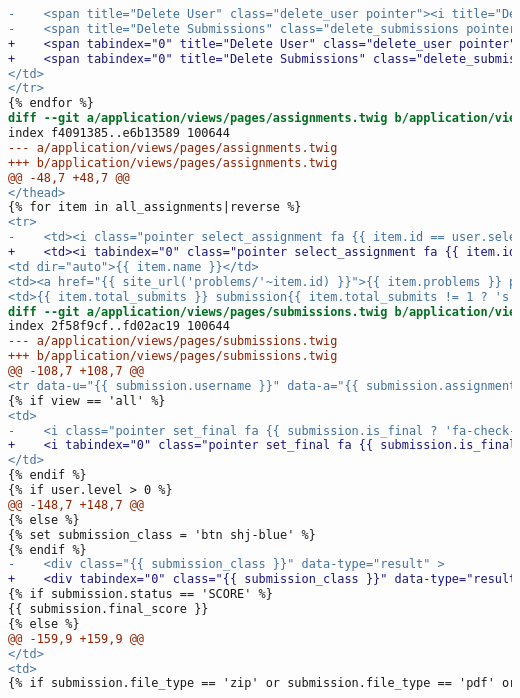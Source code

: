 \begin{itemize}
\begin{lstlisting}[language=diff, caption=Perubahan untuk mematuhi kriteria 2.1.1, label=lst_2.1.1, basicstyle=\ttfamily, frame=single,
columns=fullflexible, keepspaces=true, breaklines=true]
-    <span title="Delete User" class="delete_user pointer"><i title="Delete User" class="fa fa-times fa-lg color2"></i></span>
-    <span title="Delete Submissions" class="delete_submissions pointer"><i class="fa fa-times-circle fa-lg color1"></i></span>
+    <span tabindex="0" title="Delete User" class="delete_user pointer"><i title="Delete User" class="fa fa-times fa-lg color2"></i></span>
+    <span tabindex="0" title="Delete Submissions" class="delete_submissions pointer"><i class="fa fa-times-circle fa-lg color1"></i></span>
</td>
</tr>
{% endfor %}
diff --git a/application/views/pages/assignments.twig b/application/views/pages/assignments.twig
index f4091385..e6b13589 100644
--- a/application/views/pages/assignments.twig
+++ b/application/views/pages/assignments.twig
@@ -48,7 +48,7 @@
</thead>
{% for item in all_assignments|reverse %}
<tr>
-    <td><i class="pointer select_assignment fa {{ item.id == user.selected_assignment.id ? 'fa-check-square-o color6' : 'fa-square-o' }} fa-2x" data-id="{{ item.id }}"></i></td>
+    <td><i tabindex="0" class="pointer select_assignment fa {{ item.id == user.selected_assignment.id ? 'fa-check-square-o color6' : 'fa-square-o' }} fa-2x" data-id="{{ item.id }}"></i></td>
<td dir="auto">{{ item.name }}</td>
<td><a href="{{ site_url('problems/'~item.id) }}">{{ item.problems }} problem{{ item.problems != 1 ? 's' }}</a></td>
<td>{{ item.total_submits }} submission{{ item.total_submits != 1 ? 's' }}</td>
diff --git a/application/views/pages/submissions.twig b/application/views/pages/submissions.twig
index 2f58f9cf..fd02ac19 100644
--- a/application/views/pages/submissions.twig
+++ b/application/views/pages/submissions.twig
@@ -108,7 +108,7 @@
<tr data-u="{{ submission.username }}" data-a="{{ submission.assignment }}" data-p="{{ submission.problem }}" data-s="{{ submission.submit_id }}" {% if view == 'final' and j is even %}class="hl"{% endif %}>
{% if view == 'all' %}
<td>
-    <i class="pointer set_final fa {{ submission.is_final ? 'fa-check-circle-o color11' : 'fa-circle-o' }} fa-2x"></i>
+    <i tabindex="0" class="pointer set_final fa {{ submission.is_final ? 'fa-check-circle-o color11' : 'fa-circle-o' }} fa-2x"></i>
</td>
{% endif %}
{% if user.level > 0 %}
@@ -148,7 +148,7 @@
{% else %}
{% set submission_class = 'btn shj-blue' %}
{% endif %}
-    <div class="{{ submission_class }}" data-type="result" >
+    <div tabindex="0" class="{{ submission_class }}" data-type="result" >
{% if submission.status == 'SCORE' %}
{{ submission.final_score }}
{% else %}
@@ -159,9 +159,9 @@
</td>
<td>
{% if submission.file_type == 'zip' or submission.file_type == 'pdf' or submission.file_type == 'txt' %}

\end{lstlisting}
\end{itemize}
